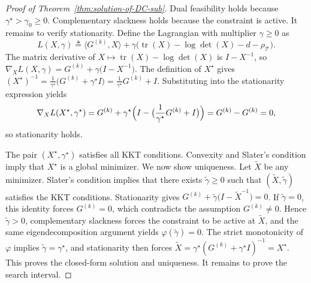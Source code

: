 \documentclass[11pt, letterpaper, oneside, reqno]{amsart}
\DeclareMathOperator{\Tr}{tr}
\newcommand{\opt}{^\star}
\newcommand{\inner}[2]{\big \langle #1, #2 \big \rangle }
\newcommand{\Let}{\triangleq}
\begin{document}
\begin{proof}[Proof of Theorem~\ref{thm:solution-of-DC-sub}]
Dual feasibility holds because $\gamma\opt>\gamma_0\ge 0$. Complementary slackness holds because the constraint is active. 
It remains to verify stationarity. Define the Lagrangian with multiplier $\gamma \ge 0$ as
\[
L(X,\gamma)
\Let \inner{G^{(k)}}{X} + \gamma\bigl(\Tr(X) - \log\det(X) - d - \rho_{\mathcal T}\bigr).
\]
The matrix derivative of $X \mapsto \Tr(X) - \log\det(X)$ is $I - X^{-1}$, so
$\nabla_X L(X,\gamma)
= G^{(k)} + \gamma\bigl(I - X^{-1}\bigr)$.
The definition of $X\opt$ gives
$(X\opt)^{-1}
= \frac{1}{\gamma\opt}\bigl(G^{(k)}+\gamma\opt I\bigr)
= \frac{1}{\gamma\opt}G^{(k)} + I$.
Substituting into the stationarity expression yields
\[
\nabla_X L(X\opt,\gamma\opt)
= G^{(k)} + \gamma\opt\Bigl(I - \bigl(\frac{1}{\gamma\opt}G^{(k)} + I\bigr)\Bigr)
= G^{(k)} - G^{(k)} = 0,
\]
so stationarity holds.

The pair $(X\opt,\gamma\opt)$ satisfies all KKT conditions. Convexity and Slater's condition imply that $X\opt$ is a global minimizer.
We now show uniqueness. Let $\tilde X$ be any minimizer. Slater's condition implies that there exists $\tilde\gamma \ge 0$ such that $(\tilde X,\tilde\gamma)$ satisfies the KKT conditions. Stationarity gives
$G^{(k)} + \tilde\gamma\bigl(I-\tilde X^{-1}\bigr)=0$.
If $\tilde\gamma=0$, this identity forces $G^{(k)}=0$, which contradicts the assumption $G^{(k)}\neq 0$. Hence $\tilde\gamma>0$, complementary slackness forces the constraint to be active at $\tilde X$, and the same eigendecomposition argument yields $\varphi(\tilde\gamma)=0$. The strict monotonicity of $\varphi$ implies $\tilde\gamma=\gamma\opt$, and stationarity then forces $\tilde X = \gamma\opt(G^{(k)}+\gamma\opt I)^{-1} = X\opt$. This proves the closed-form solution and uniqueness. It remains to prove the search interval.


\end{proof}
\end{document}
